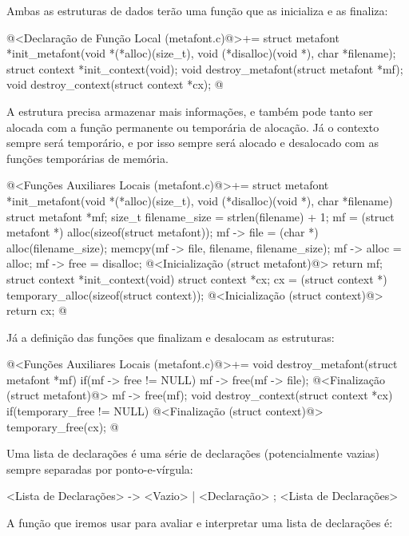 Ambas as estruturas de dados terão uma função que as inicializa e as
finaliza:

\iniciocodigo
@<Declaração de Função Local (metafont.c)@>+=
struct metafont *init_metafont(void *(*alloc)(size_t),
                              void (*disalloc)(void *),
                              char *filename);
struct context *init_context(void);
void destroy_metafont(struct metafont *mf);
void destroy_context(struct context *cx);
@
\fimcodigo

A estrutura  precisa armazenar mais informações,
e também pode tanto ser alocada com a função permanente ou temporária
de alocação. Já o contexto sempre será temporário, e por isso sempre
será alocado e desalocado com as funções temporárias de memória.

\iniciocodigo
@<Funções Auxiliares Locais (metafont.c)@>+=
struct metafont *init_metafont(void *(*alloc)(size_t),
                              void (*disalloc)(void *),
                              char *filename){
  struct metafont *mf;
  size_t filename_size = strlen(filename) + 1;
  mf = (struct metafont *) alloc(sizeof(struct metafont));
  mf -> file = (char *) alloc(filename_size);
  memcpy(mf -> file, filename, filename_size);
  mf -> alloc = alloc;
  mf -> free = disalloc;
  @<Inicialização (struct metafont)@>
  return mf;
}
struct context *init_context(void){
  struct context *cx;
  cx = (struct context *) temporary_alloc(sizeof(struct context));
  @<Inicialização (struct context)@>
  return cx;
}
@
\fimcodigo

Já a definição das funções que finalizam e desalocam as estruturas:

\iniciocodigo
@<Funções Auxiliares Locais (metafont.c)@>+=
void destroy_metafont(struct metafont *mf){
  if(mf -> free != NULL){
    mf -> free(mf -> file);
    @<Finalização (struct metafont)@>
    mf -> free(mf);
  }
}
void destroy_context(struct context *cx){
  if(temporary_free != NULL){
    @<Finalização (struct context)@>
    temporary_free(cx);
  }
}
@
\fimcodigo


Uma lista de declarações é uma série de declarações (potencialmente
vazias) sempre separadas por ponto-e-vírgula:

\alinhaverbatim
<Lista de Declarações> -> <Vazio> | <Declaração> ; <Lista de Declarações>
\alinhanormal

A função que iremos usar para avaliar e interpretar uma lista de
declarações é:


